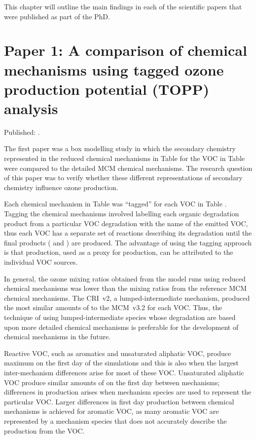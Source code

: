 This chapter will outline the main findings in each of the scientific papers that were published as part of the PhD.

\section{Paper 1: A comparison of chemical mechanisms using tagged ozone production potential (TOPP) analysis}

Published: .
\vspace{5mm}

The first paper was a box modelling study in which the secondary chemistry represented in the reduced chemical mechanisms in Table  for the VOC in Table  were compared to the detailed MCM chemical mechanisms.
The research question of this paper was to verify whether these different representations of secondary chemistry influence ozone production.

Each chemical mechanism in Table  was ``tagged'' for each VOC in Table . 
Tagging the chemical mechanisms involved labelling each organic degradation product from a particular VOC degradation with the name of the emitted VOC, thus each VOC has a separate set of reactions describing its degradation until the final products ( and ) are produced.
The advantage of using the tagging approach is that  production, used as a proxy for  production, can be attributed to the individual VOC sources.

In general, the ozone mixing ratios obtained from the model runs using reduced chemical mechanisms was lower than the mixing ratios from the reference MCM chemical mechanisms.
The CRI~v2, a lumped-intermediate mechanism, produced the most similar amounts of  to the MCM~v3.2 for each VOC.
Thus, the technique of using lumped-intermediate species whose degradation are based upon more detailed chemical mechanisms is preferable for the development of chemical mechanisms in the future.

Reactive VOC, such as aromatics and unsaturated aliphatic VOC, produce maximum  on the first day of the simulations and this is also when the largest inter-mechanism differences arise for most of these VOC.
Unsaturated aliphatic VOC produce similar amounts of  on the first day between mechanisms; differences in  production arises when mechanism species are used to represent the particular VOC.
Larger differences in first day  production between chemical mechanisms is achieved for aromatic VOC, as many aromatic VOC are represented by a mechanism species that does not accurately describe the  production from the VOC.

